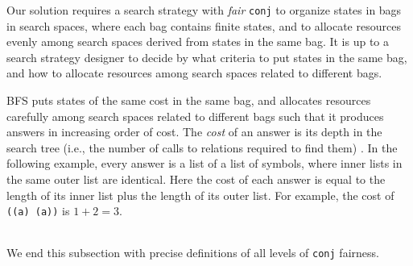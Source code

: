 \documentclass[format=acmlarge, review=true, authordraft=true]{acmart}
\newcommand{\conj}{\texttt{conj}}
\newcommand{\BFS}[0]{BFS}
\begin{document}

\begin{center}
	\begin{tabular}{c}
		
	\end{tabular}
\end{center}

Our solution requires a search strategy with \emph{fair} \conj{} to organize
states in bags in search spaces, where each bag contains finite states, and 
to allocate resources evenly among search spaces derived from states in the 
same bag. It is up to a search strategy designer to decide by what criteria to 
put states in the same bag, and how to allocate resources among search spaces 
related to different bags.

\BFS{} puts states of the same cost in the same bag, and allocates
resources carefully among search spaces related to different bags such
that it produces answers in increasing order of cost. The \emph{cost}
of an answer is its depth in the search tree (i.e., the number of
calls to relations required to find them) \citep{seres1999algebra}. In
the following example, every answer is a list of a list of symbols,
where inner lists in the same outer list are identical. Here the cost of each 
answer is equal
to the length of its inner list plus the length of its outer list. For example,
the cost of \texttt{((a) (a))} is $1 + 2 = 3$.


\begin{center}
	\begin{tabular}{c}
		
	\end{tabular}
\end{center}

We end this subsection with precise definitions of all levels of \conj{} 
fairness.
\end{document}
